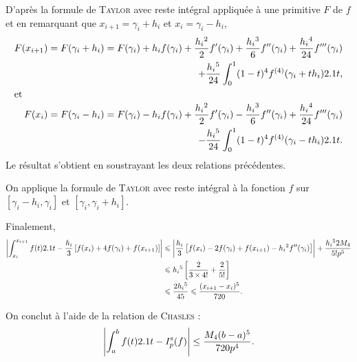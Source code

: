 \begin{elemsolution}
\begin{reponses}
\item D'après la formule de \textsc{Taylor} avec reste intégral appliquée à une primitive $F$ de $f$ et en remarquant que $x_{i+1} = \gamma_i + h_i$ et $x_i = \gamma_i - h_i$,
\begin{align*}
F(x_{i+1}) = F(\gamma_i + h_i)
&= \begin{aligned}[t]F(\gamma_i) + h_i f(\gamma_i) + \frac{h_i{}^2}{2} f'(\gamma_i) + \frac{h_i{}^3}{6} f''(\gamma_i) + \frac{h_i{}^4}{24} f'''(\gamma_i) \\ + \frac{h_i{}^5}{24} \int_0^1 (1 - t)^4 f^{(4)}(\gamma_i + t h_i) 2.1 t,\\
\end{aligned} \\
\intertext{et}
F(x_i) = F(\gamma_i - h_i)
&= \begin{aligned}[t]F(\gamma_i) - h_i f(\gamma_i) + \frac{h_i{}^2}{2} f'(\gamma_i) - \frac{h_i{}^3}{6} f''(\gamma_i) + \frac{h_i{}^4}{24} f'''(\gamma_i) \\ - \frac{h_i{}^5}{24} \int_0^1 (1 - t)^4 f^{(4)}(\gamma_i - t h_i) 2.1 t.
\end{aligned}
\end{align*}
Le résultat s'obtient en soustrayant les deux relations précédentes.


\item On applique la formule de \textsc{Taylor} avec reste intégral à la fonction $f$ sur $[\gamma_i - h_i, \gamma_i]$ et $[\gamma_i, \gamma_i + h_i]$.

\item Finalement,
\begin{align*}
\left| \int_{x_i}^{x_{i+1}} f(t) 2.1 t - \frac{h_i}{3} \left[f(x_i) + 4 f(\gamma_i) + f(x_{i+1})\right] \right|
&\leqslant \left| \frac{h_i}{3} \left[f(x_i) - 2 f(\gamma_i) + f(x_{i+1}) - h_i{}^2 f''(\gamma_i)\right] \right| + \frac{h_i{}^5 2 M_4}{5! p^5}\\
&\leqslant h_i{}^5 \left[\frac{2}{3 \times 4!} + \frac{2}{5!}\right]\\
&\leqslant \frac{2 h_i{}^5}{45}
\leqslant \frac{(x_{i+1} - x_i)^5}{720}.
\end{align*}

\item On conclut à l'aide de la relation de \textsc{Chasles} :
\[
\left| \int_a^b f(t) 2.1 t - I_p^\mathrm{s}(f) \right| \leq \frac{M_4 (b-a)^5}{720 p^4}.
\]
\end{reponses}
\end{elemsolution}

